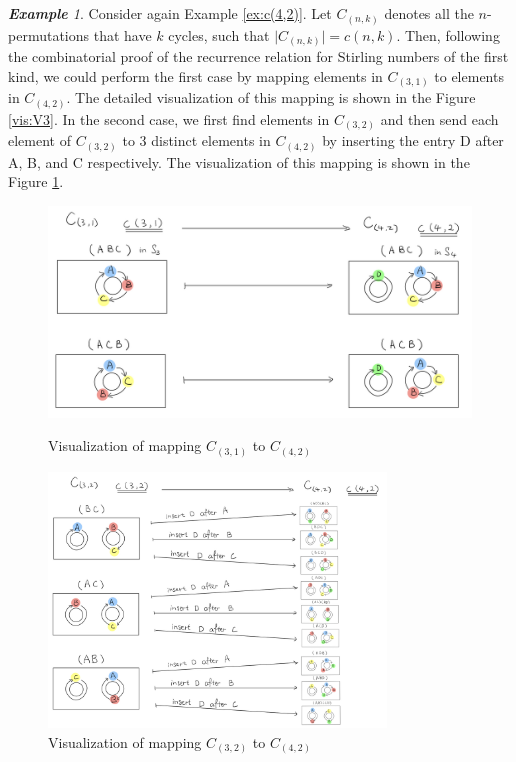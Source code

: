 \documentclass{article}
\theoremstyle{definition}
\theoremstyle{remark}
\theoremstyle{example}
\newtheorem{example}{\textbf{Example}}[section]
\begin{document}
\begin{example}
    Consider again Example \ref{ex:c(4,2)}. Let $C_{(n,k)}$ denotes all the $n$-permutations that have $k$ cycles, such that $\lvert C_{(n,k)}\rvert = c(n,k)$. Then, following the combinatorial proof of the recurrence relation for Stirling numbers of the first kind, we could perform the first case by mapping elements in $C_{(3,1)}$ to elements in $C_{(4,2)}$. The detailed visualization of this mapping is shown in the Figure \ref{vis:V3}. In the second case, we first find elements in $C_{(3,2)}$ and then send each element of $C_{(3,2)}$ to $3$ distinct elements in $C_{(4,2)}$ by inserting the entry D after A, B, and C respectively. The visualization of this mapping is shown in the Figure \ref{vis:V2}.
    
    
    \begin{figure}[H]
        \centering
        \begin{minipage}{.5\textwidth}
            \centering
            \includegraphics[width=1\textwidth]{Visualization3.jpeg}
            \caption{\label{vis:V3}Visualization of mapping $C_{(3,1)}$ to $C_{(4,2)}$}
        \end{minipage}%
        \begin{minipage}{.5\textwidth}
            \centering
            \includegraphics[width=0.8\textwidth]{Visualization2.jpeg}
            \caption{\label{vis:V2}Visualization of mapping $C_{(3,2)}$ to $C_{(4,2)}$}
        \end{minipage}
    \end{figure}
\end{example}
\end{document}
